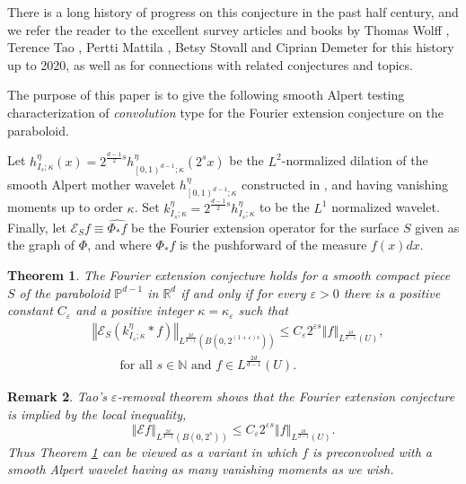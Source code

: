 \documentclass{amsart}%
\newtheorem{theorem}{Theorem}
\theoremstyle{plain}
\newtheorem{remark}[theorem]{Remark}
\numberwithin{equation}{section}
\begin{document}
There is a long history of progress on this conjecture in the past half
century, and we refer the reader to the excellent survey articles and books by
Thomas Wolff \cite{Wol}, Terence Tao \cite{Tao}, Pertti Mattila \cite{Mat},
Betsy Stovall \cite{Sto} and Ciprian Demeter \cite{Dem} for this history up to
2020, as well as for connections with related conjectures and topics.

The purpose of this paper is to give the following smooth Alpert testing
characterization of \emph{convolution} type for the Fourier extension
conjecture on the paraboloid.

Let $h_{I_{s};\kappa}^{\eta}\left(  x\right)  =2^{\frac{d-1}{2}s}h_{\left[
0,1\right)  ^{d-1};\kappa}^{\eta}\left(  2^{s}x\right)  $ be the $L^{2}%
$-normalized dilation of the smooth Alpert mother wavelet $h_{\left[
0,1\right)  ^{d-1};\kappa}^{\eta}$ constructed in \cite{Saw7}, and having
vanishing moments up to order $\kappa$. Set $k_{I_{s};\kappa}^{\eta}%
=2^{\frac{d-1}{2}s}h_{I_{s};\kappa}^{\eta}$ to be the $L^{1}$ normalized
wavelet. Finally, let $\mathcal{E}_{S}f\equiv\widehat{\Phi_{\ast}f}$ be the
Fourier extension operator for the surface $S$ given as the graph of $\Phi$,
and where $\Phi_{\ast}f$ is the pushforward of the measure $f\left(  x\right)
dx$.

\begin{theorem}
\label{reform}The Fourier extension conjecture holds for a smooth compact
piece $S$ of the paraboloid $\mathbb{P}^{d-1}$ in $\mathbb{R}^{d}$ \emph{if
and only if} for every $\varepsilon>0$ there is a positive constant
$C_{\varepsilon}$ and a positive integer $\kappa=\kappa_{\varepsilon}$ such
that%
\begin{align}
& \left\Vert \mathcal{E}_{S}\left(  k_{I_{s};\kappa}^{\eta}\ast f\right)
\right\Vert _{L^{\frac{2d}{d-1}}\left(  B\left(  0,2^{\left(  1+\varepsilon
\right)  s}\right)  \right)  }\leq C_{\varepsilon}2^{\varepsilon s}\left\Vert
f\right\Vert _{L^{\frac{2d}{d-1}}\left(  U\right)  },\label{reform'}\\
& \ \ \ \ \ \ \ \ \ \ \text{for all }s\in\mathbb{N}\text{ and }f\in
L^{\frac{2d}{d-1}}\left(  U\right)  .\nonumber
\end{align}

\end{theorem}

\begin{remark}
Tao's $\varepsilon$-removal theorem \cite{Tao1} shows that the Fourier
extension conjecture is implied by the local inequality,%
\[
\left\Vert \mathcal{E}f\right\Vert _{L^{\frac{2d}{d-1}}\left(  B\left(
0,2^{s}\right)  \right)  }\leq C_{\varepsilon}2^{\varepsilon s}\left\Vert
f\right\Vert _{L^{\frac{2d}{d-1}}\left(  U\right)  }.
\]
Thus Theorem \ref{reform} can be viewed as a variant in which $f$ is
preconvolved with a smooth Alpert wavelet having as many vanishing moments as
we wish.
\end{remark}
\end{document}

